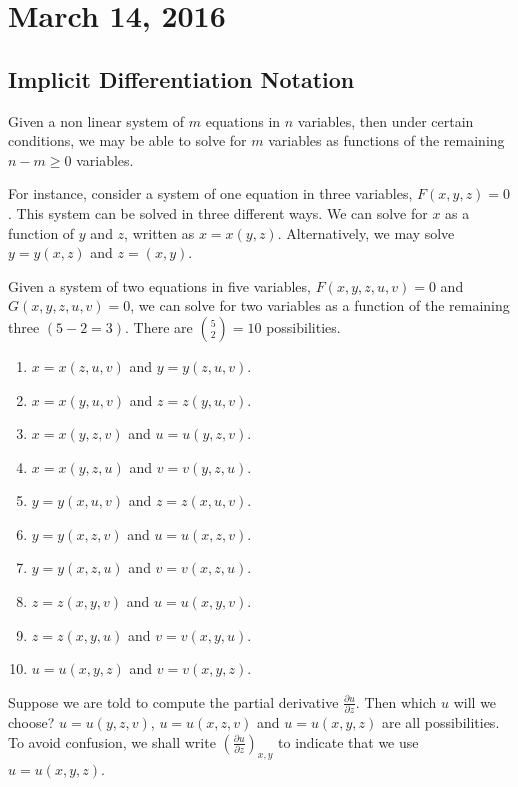 \documentclass[11pt]{article}
\theoremstyle{plain} %
\theoremstyle{definition}
\theoremstyle{example}
\theoremstyle{remark}
\begin{document}
\section{March 14, 2016}
\subsection{Implicit Differentiation Notation}

Given a non linear system of $m$ equations in $n$ variables, then under certain conditions, we may be able to solve for $m$ variables as functions of the remaining $n-m \geq 0 $ variables.

For instance, consider a system of one equation in three variables, $F(x,y,z) = 0$. This system can be solved in three different ways. We can solve for $x$ as a function of $y$ and $z$, written as $x=x(y,z)$. Alternatively, we may solve $y=y(x,z)$ and $z=(x,y)$. 

Given a system of two equations in five variables, $F(x, y, z, u, v) = 0$ and $G(x, y, z, u, v) = 0$, we can solve for two variables as a function of the remaining three $(5-2=3)$. There are $\binom{5}{2} = 10$ possibilities.

\begin{enumerate}
	\item $x = x(z, u, v)$ and $y = y(z, u, v)$.
	\item $x = x(y, u, v)$ and $z = z(y, u, v)$.
	\item $x = x(y, z, v)$ and $u = u(y,z, v)$.
	\item $x = x(y, z, u)$ and $v = v(y, z, u)$.
	\item $y = y(x, u, v)$ and $z = z(x, u, v)$.
	\item $y = y(x,z, v)$ and $u = u(x,z, v)$.
	\item $y = y(x, z, u)$ and $v=v(x, z, u)$.
	\item $z = z(x, y, v)$ and $u = u(x, y, v)$.
	\item $z = z(x, y, u)$ and $v = v(x, y, u)$.
	\item $u = u(x, y, z)$ and $v = v(x, y, z)$.
\end{enumerate}

Suppose we are told to compute the partial derivative $\frac{\partial u}{\partial z}$. Then which $u$ will we choose? $u = u(y, z, v)$, $u = u (x, z, v)$ and $u = u(x, y, z)$ are all possibilities. To avoid confusion, we shall write $\left(\frac{\partial u}{\partial z}\right)_{x,y}$ to indicate that we use $u = u(x, y, z)$. 
\end{document}
